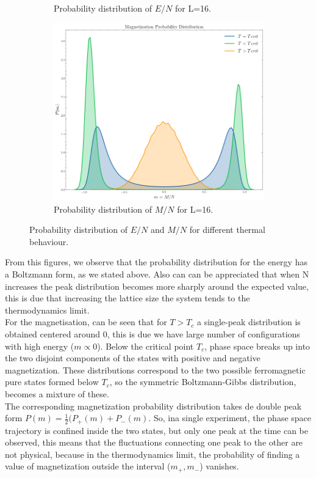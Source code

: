\documentclass[article]{revtex4}
\begin{document}
\begin{figure}[h!]
\begin{subfigure}{.5\textwidth}
  \caption{Probability distribution of $E/N$ for L=16.}
\end{subfigure}%
\begin{subfigure}{.5\textwidth}
  \centering
  \includegraphics[width=0.7\linewidth]{hist_L16.png}
  \caption{Probability distribution of $M/N$ for L=16.}
\end{subfigure}
\caption{Probability distribution of $E/N$ and $M/N$ for different thermal behaviour.}
\end{figure}
From this figures, we observe that the probability distribution for the energy has a Boltzmann form, as we stated above. Also can can be appreciated that when 
N increases the peak distribution becomes more sharply around the expected value, this is due that increasing the lattice size
the system tends to the thermodynamics limit. \\
For the magnetisation, can be seen that for $T>T_c$ a single-peak distribution is obtained centered around 0, this is due 
we have large number of configurations with high energy ($m\propto 0$). Below the critical point $T_c$, phase space breaks up into the two disjoint components
of the states with positive and negative magnetization. These distributions correspond to the two possible ferromagnetic pure states formed below $T_c$, so
the symmetric Boltzmann-Gibbs distribution, becomes a mixture of these.\\
 The corresponding magnetization probability distribution takes de double peak form 
$P(m) = \frac{1}{2}(P_{+}(m) + P_{-}(m)$. So, ina  single experiment, the phase space trajectory is confined inside the two states, but only one
peak at the time can be observed, this means that the fluctuations connecting one peak to the other are not physical, because in the thermodynamics limit,
the probability of finding a value of magnetization outside the interval ($m_{+},m_{-}$) vanishes.
\newpage
\end{document}
